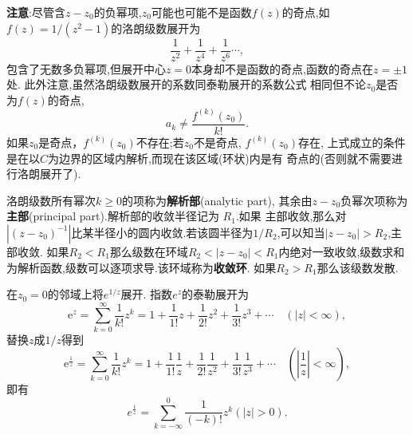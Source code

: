 \textbf{注意}:尽管含$z-z_0$的负幂项,$z_0$可能也可能不是函数$f(z)$的奇点,如$f(z) = 1/(z^2-1)$的洛朗级数展开为
$$
\frac{1}{z^2} + \frac{1}{z^4} + \frac{1}{z^6}\cdots,
$$
包含了无数多负幂项,但展开中心$z=0$本身却不是函数的奇点,函数的奇点在$z=\pm 1$处. 此外注意,虽然洛朗级数展开的系数同泰勒展开的系数公式
相同但不论$z_0$是否为$f(z)$的奇点,
$$a_k \neq \frac{f^{(k)}(z_0)}{k!}.
$$
如果$z_0$是奇点，$f^{(k)}(z_0)$不存在;若$z_0$不是奇点, $f^{(k)}(z_0)$存在, 上式成立的条件是在以$C$为边界的区域内解析,而现在该区域(环状)内是有
奇点的(否则就不需要进行洛朗展开了).

洛朗级数所有幂次$k\geq 0$的项称为\textbf{解析部}(analytic part), 其余由$z-z_0$负幂次项称为\textbf{主部}(principal part).解析部的收敛半径记为
$R_1$.如果
主部收敛,那么对$|(z-z_0)^{-1}|$比某半径小的圆内收敛.若该圆半径为$1/R_2$,可以知当$|z-z_0|> R_2$,主部收敛.
如果$R_2 < R_1$那么级数在环域$R_2 < |z- z_0| < R_1$内绝对一致收敛,级数求和为解析函数,级数可以逐项求导.该环域称为\textbf{收敛环}.
如果$R_2 > R_1$那么该级数发散.

\begin{examplebox}{在$z_0 = 0$的邻域上将$e^{1/z}$展开.}
指数$e^z$的泰勒展开为
\[
    \mathrm{e}^z=\sum_{k=0}^{\infty} \frac{1}{k !} z^k=1+\frac{1}{1 !} z+\frac{1}{2 !} z^2+\frac{1}{3 !} z^3+\cdots \quad(|z|<\infty),    
\]
替换$z$成$1/z$得到
\[
    \mathrm{e}^{\frac{1}{z}}=\sum_{k=0}^{\infty} \frac{1}{k !} z^k=1+\frac{1}{1 !} \frac{1}{z}+\frac{1}{2 !} \frac{1}{z^2}+\frac{1}{3 !} \frac{1}{z^3}+\cdots \quad(|\frac{1}{z}|<\infty),    
\]
即有
\[
e^{\frac{1}{z}} = \sum_{k=-\infty}^{0} \frac{1}{(-k)!} z^k ( |z| > 0) .
\]
\end{examplebox}
